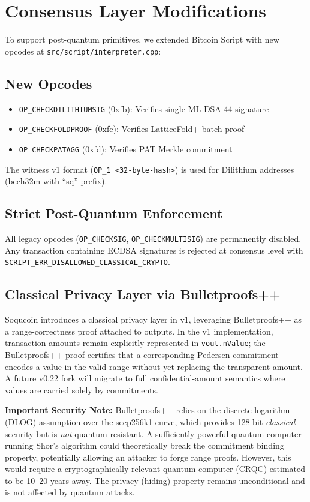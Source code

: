 \documentclass[10pt]{article}
\begin{document}
\section{Consensus Layer Modifications}

To support post-quantum primitives, we extended Bitcoin Script with new opcodes at \texttt{src/script/interpreter.cpp}:

\subsection{New Opcodes}
\begin{itemize}
    \item \texttt{OP\_CHECKDILITHIUMSIG} (0xfb): Verifies single ML-DSA-44 signature
    \item \texttt{OP\_CHECKFOLDPROOF} (0xfc): Verifies LatticeFold+ batch proof
    \item \texttt{OP\_CHECKPATAGG} (0xfd): Verifies PAT Merkle commitment
\end{itemize}

The witness v1 format (\texttt{OP\_1 <32-byte-hash>}) is used for Dilithium addresses (bech32m with ``sq'' prefix).

\subsection{Strict Post-Quantum Enforcement}
All legacy opcodes (\texttt{OP\_CHECKSIG}, \texttt{OP\_CHECKMULTISIG}) are permanently disabled. Any transaction containing ECDSA signatures is rejected at consensus level with \texttt{SCRIPT\_ERR\_DISALLOWED\_CLASSICAL\_CRYPTO}.

\subsection{Classical Privacy Layer via Bulletproofs++}
Soqucoin introduces a classical privacy layer in v1, leveraging Bulletproofs++ as a range-correctness proof attached to outputs. In the v1 implementation, transaction amounts remain explicitly represented in \texttt{vout.nValue}; the Bulletproofs++ proof certifies that a corresponding Pedersen commitment encodes a value in the valid range without yet replacing the transparent amount. A future v0.22 fork will migrate to full confidential-amount semantics where values are carried solely by commitments.

\textbf{Important Security Note:} Bulletproofs++ relies on the discrete logarithm (DLOG) assumption over the secp256k1 curve, which provides 128-bit \textit{classical} security but is \textit{not} quantum-resistant. A sufficiently powerful quantum computer running Shor's algorithm could theoretically break the commitment binding property, potentially allowing an attacker to forge range proofs. However, this would require a cryptographically-relevant quantum computer (CRQC) estimated to be 10--20 years away. The privacy (hiding) property remains unconditional and is not affected by quantum attacks.
\end{document}
